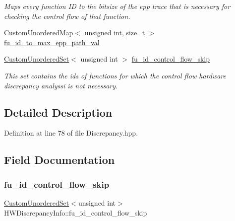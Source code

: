 \begin{DoxyCompactItemize}
\begin{DoxyCompactList}\small\item\em Maps every function ID to the bitsize of the epp trace that is necessary for checking the control flow of that function. \end{DoxyCompactList}\item 
\hyperlink{custom__map_8hpp_ad1ed68f2ff093683ab1a33522b144adc}{Custom\+Unordered\+Map}$<$ unsigned int, \hyperlink{tutorial__fpt__2017_2intro_2sixth_2test_8c_a7c94ea6f8948649f8d181ae55911eeaf}{size\+\_\+t} $>$ \hyperlink{structHWDiscrepancyInfo_a8d563f0d9fde448ec9281c775d734f20}{fu\+\_\+id\+\_\+to\+\_\+max\+\_\+epp\+\_\+path\+\_\+val}
\item 
\hyperlink{classCustomUnorderedSet}{Custom\+Unordered\+Set}$<$ unsigned int $>$ \hyperlink{structHWDiscrepancyInfo_a83cb969d9bec6c873907cf87f4ac5ad7}{fu\+\_\+id\+\_\+control\+\_\+flow\+\_\+skip}
\begin{DoxyCompactList}\small\item\em This set contains the ids of functions for which the control flow hardware discrepancy analyssi is not necessary. \end{DoxyCompactList}\end{DoxyCompactItemize}


\subsection{Detailed Description}


Definition at line 78 of file Discrepancy.\+hpp.



\subsection{Field Documentation}
\mbox{\label{structHWDiscrepancyInfo_a83cb969d9bec6c873907cf87f4ac5ad7}} 
\subsubsection{\texorpdfstring{fu\+\_\+id\+\_\+control\+\_\+flow\+\_\+skip}{fu\_id\_control\_flow\_skip}}
{\footnotesize\ttfamily \hyperlink{classCustomUnorderedSet}{Custom\+Unordered\+Set}$<$unsigned int$>$ H\+W\+Discrepancy\+Info\+::fu\+\_\+id\+\_\+control\+\_\+flow\+\_\+skip}



